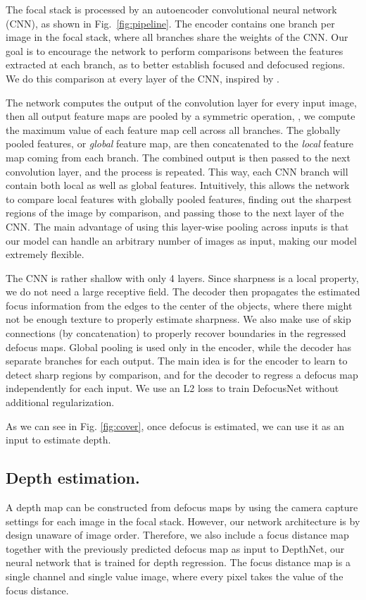 \documentclass[10pt,twocolumn,letterpaper]{article}
\begin{document}
The focal stack is processed by an autoencoder convolutional neural network (CNN), as shown in Fig.~\ref{fig:pipeline}.
The encoder contains one branch per image in the focal stack, where all branches share the weights of the CNN. 
Our goal is to encourage the network to perform comparisons between the features extracted at each branch, as to better establish focused and defocused regions. 
We do this comparison at every layer of the CNN, inspired by \cite{Aittala18}.


 The network computes the output of the convolution layer for every input image, then all output feature maps are pooled by a symmetric operation, \ie, we compute the maximum value of each feature map cell across all branches.
The globally pooled features, or {\it global} feature map, are then concatenated to the {\it local} feature map coming from each branch. The combined output is then passed to the next convolution layer, and the process is repeated. 
This way, each CNN branch will contain both local as well as global features. 
Intuitively, this allows the network to compare local features with globally pooled features, finding out the sharpest regions of the image by comparison, and passing those to the next layer of the CNN.
The main advantage of using this layer-wise pooling across inputs is that our model can handle an arbitrary number of images as input, making our model extremely flexible.


The CNN is rather shallow with only 4 layers. Since sharpness is a local property, we do not need a large receptive field.  
The decoder then propagates the estimated focus information from the edges to the center of the objects, where there might not be enough texture to properly estimate sharpness. We also make use of skip connections (by concatenation) to properly recover boundaries in the regressed defocus maps.
Global pooling is used only in the encoder, while the decoder has separate branches for each output. The main idea is for the encoder to learn to detect sharp regions by comparison, and for the decoder to regress a defocus map independently for each input.
We use an L2 loss to train DefocusNet without additional regularization.

As we can see in Fig. \ref{fig:cover}, once defocus is estimated, we can use it as an input to estimate depth. 


\subsection{Depth estimation.} \label{sec:depth_est}
A depth map can be constructed from defocus maps by using the camera capture settings for each image in the focal stack.
However, our network architecture is by design unaware of image order. 
Therefore, we also include a focus distance map together with the previously predicted defocus map as input to DepthNet, our neural network that is trained for depth regression. The focus distance map is a single channel and single value image,
where every pixel takes the value of the focus distance.
\end{document}
